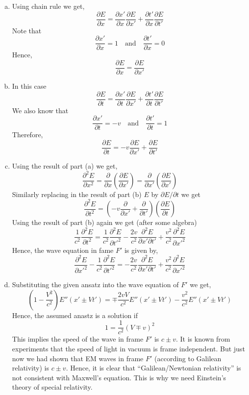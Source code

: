 \documentclass[makesolutionspdf]{esg8022pset}
\begin{document}
\begin{solution}
  \begin{enumerate}[(a)]
    \item Using chain rule we get,
      $$\frac{\partial E}{\partial x} = \frac{\partial x'}{\partial x}\frac{\partial E}{\partial x'} + \frac{\partial t'}{\partial x}\frac{\partial E}{\partial t'}$$
      Note that
      $$\frac{\partial x'}{\partial x} = 1 \quad \mbox{and} \quad  \frac{\partial t'}{\partial x} = 0$$
      Hence,
      $$\frac{\partial E}{\partial x} = \frac{\partial E}{\partial x'}$$
      
    \item In this case
      $$\frac{\partial E}{\partial t} = \frac{\partial x'}{\partial t}\frac{\partial E}{\partial x'} + \frac{\partial t'}{\partial t}\frac{\partial E}{\partial t'}$$
      We also know that
      $$\frac{\partial x'}{\partial t} = -v \quad \mbox{and} \quad  \frac{\partial t'}{\partial t} = 1$$
      Therefore,
      $$\frac{\partial E}{\partial t} = -v \frac{\partial E}{\partial x'} + \frac{\partial E}{\partial t'}$$
      
    \item Using the result of part (a) we get,
      $$\frac{\partial^2E}{\partial x^2}=\frac{\partial }{\partial x} ( \frac{\partial E}{\partial x'})= \frac{\partial }{\partial x'}(\frac{\partial E}{\partial x'}) $$
      Similarly replacing in the result of part (b) $E$ by ${\partial E}/\partial t$ we get 
      $$\frac{\partial^{2} E}{\partial t^{2}} = (-v \frac{\partial }{\partial x'} + \frac{\partial }{\partial t'}) ( \frac{\partial E}{\partial t} )$$
      Using the result of part (b) again we get (after some algebra)
      $$ \frac{1}{c^2} \frac{\partial^2E}{\partial t^2}= \frac{1}{c^2} \frac{\partial^2E}{\partial t'^2}  -\frac{2v}{c^2} \frac{\partial^2E}{\partial x' \partial t'} + \frac{v^2}{c^2} \frac{\partial^2E}{\partial x'^2}$$
      Hence, the wave equation in fame $F'$ is given by,
      $$\frac{\partial^2E}{\partial x'^2} - \frac{1}{c^2} \frac{\partial^2E}{\partial t'^2} = -\frac{2v}{c^2} \frac{\partial^2E}{\partial x' \partial t'} + \frac{v^2}{c^2} \frac{\partial^2E}{\partial x'^2}$$
      
    \item Substituting the given ansatz into the wave equation of $F'$ we get,
      $$(1 - \frac{V^{2}}{c^{2}}) E''(x' \pm Vt') = \mp\frac{2 vV}{c^{2}} E''(x' \pm Vt') - \frac{v^{2}}{c^{2}}E''(x' \pm Vt')$$
      Hence, the assumed anastz is a solution if
      $$1 = \frac{1}{c^{2}}( V \mp v)^{2} $$
      This implies the speed of the wave in frame $F'$ is $c\pm v$. It is known from experiments that the speed of light in vacuum is frame independent. But just now we had shown that EM waves in frame $F'$ (according to Galilean relativity) is $c\pm v$. Hence, it is clear that ``Galilean/Newtonian relativity'' is not consistent with Maxwell's equation. This is why we need Einstein's theory of special relativity. 
  \end{enumerate}
\end{solution}
\end{document}

